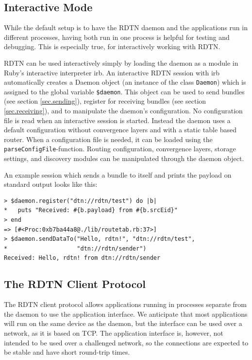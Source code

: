 \documentclass[a4paper]{article}
\begin{document}
\subsection{Interactive Mode}\label{sec.interactive}

While the default setup is to have the RDTN daemon and the applications run in
different processes, having both run in one process is helpful for testing and
debugging. This is especially true, for interactively working with
RDTN. 

RDTN can be used interactively simply by loading the daemon as a module in
Ruby's interactive interpreter irb.  An interactive RDTN session with irb
automatically creates a Daemon object (an instance of the class {\tt Daemon})
which is assigned to the global variable {\tt \$daemon}. This object can be used
to send bundles (see section \ref{sec.sending}), register for receiving bundles
(see section \ref{sec.receiving}), and to manipulate the daemon's configuration.
No configuration file is read when an interactive session is started. Instead
the daemon uses a default configuration without convergence layers and with a
static table based router. When a configuration file is needed, it can be loaded
using the {\tt parseConfigFile}-function. Routing configuration, convergence
layers, storage settings, and discovery modules can be manipulated through the
daemon object.

An example session which sends a bundle to itself and prints the payload on
standard output looks like this:

\begin{verbatim}
> $daemon.register("dtn://rdtn/test") do |b|
*   puts "Received: #{b.payload} from #{b.srcEid}"
> end
=> [#<Proc:0xb7ba44a8@./lib/routetab.rb:37>]
> $daemon.sendDataTo("Hello, rdtn!", "dtn://rdtn/test",
*                    "dtn://rdtn/sender")
Received: Hello, rdtn! from dtn://rdtn/sender
\end{verbatim}

\subsection{The RDTN Client Protocol}\label{sec.client-protocol}

The RDTN client protocol allows applications running in processes separate from
the daemon to use the application interface. We anticipate that most
applications will run on the same device as the daemon, but the interface can be
used over a network, as it is based on TCP. The application interface is,
however, not intended to be used over a challenged network, so the connections
are expected to be stable and have short round-trip times.
\end{document}
